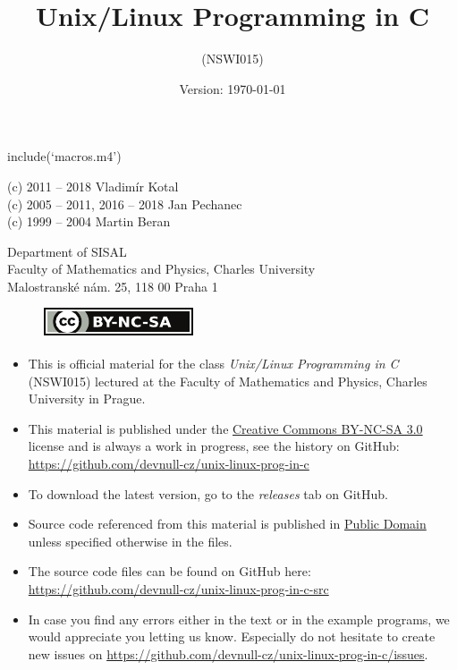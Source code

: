
include(`macros.m4')

\begin{slide}
\centerslidestrue
\begin{center}
\title{\LARGE Unix/Linux Programming in C}
\author{(NSWI015)}
\date{Version: \rm\today}
\maketitle


\vspace{2ex}
{\small (c) 2011 -- 2018 Vladim\'{i}r Kotal}\\
{\small (c) 2005 -- 2011, 2016 -- 2018 Jan Pechanec}\\
{\small (c) 1999 -- 2004 Martin Beran}

\vspace{2ex}
Department of SISAL\\
Faculty of Mathematics and Physics, Charles University\\
Malostransk\'{e} n\'{a}m. 25, 118 00 Praha 1 

\begin{figure}[htb!]
  \includegraphics[scale=0.75]{img/by-nc-sa-small}
\end{figure}
\end{center}
\end{slide}

\begin{itemize}
\item This is official material for the class \emph{Unix/Linux Programming in C}
(NSWI015) lectured at the Faculty of Mathematics and Physics, Charles University
in Prague.
\item This material is published under the
\href{http://creativecommons.org/licenses/by-nc-sa/3.0/cz/}{Creative Commons
BY-NC-SA 3.0} license and is always a work in progress, see the history on
GitHub:\\
\url{https://github.com/devnull-cz/unix-linux-prog-in-c}
\item To download the latest version, go to the \emph{releases} tab on GitHub.
\item Source code referenced from this material is published in
\href{http://creativecommons.org/licenses/publicdomain/}{Public Domain} unless
specified otherwise in the files.
\item The source code files can be found on GitHub here:\\
\url{https://github.com/devnull-cz/unix-linux-prog-in-c-src}
\item In case you find any errors either in the text or in the example programs,
we would appreciate you letting us know. Especially do not hesitate to create new
issues on \url{https://github.com/devnull-cz/unix-linux-prog-in-c/issues}.
\end{itemize}

